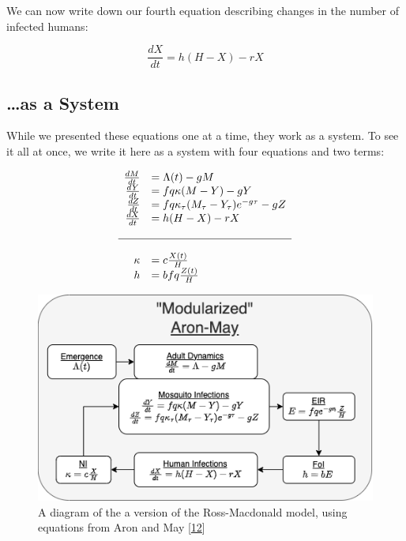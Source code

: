 \documentclass[
]{book}
\begin{document}
We can now write down our fourth equation describing changes in the number of infected humans:

\begin{equation}
\frac{dX}{dt} = h (H-X) - r X 
\end{equation}

\hypertarget{as-a-system}{%
\subsection{\ldots as a System}\label{as-a-system}}

While we presented these equations one at a time, they work as a system. To see it all at once, we write it here as a system with four equations and two terms:

\begin{equation}
\begin{array}{rl}
\frac{dM}{dt} &= \Lambda(t) - g M \\
\frac{dY}{dt} &= fq\kappa(M-Y) - g Y \\
\frac{dZ}{dt} &= fq\kappa_\tau(M_\tau-Y_\tau)e^{-g\tau} - g Z \\
\frac{dX}{dt} &= h (H-X) - rX  \\ \\ \hline \\ 
\kappa &= c \frac{X(t)}{H} \\
h &= b fq \frac{Z(t)}{H} \\
\end{array}
\end{equation}

\begin{figure}
\centering
\includegraphics{Figures/AronMay.png}
\caption{A diagram of the a version of the Ross-Macdonald model, using equations from Aron and May {[}\protect\hyperlink{ref-AronJL1982PopulationDynamics}{12}{]}}
\end{figure}
\end{document}
